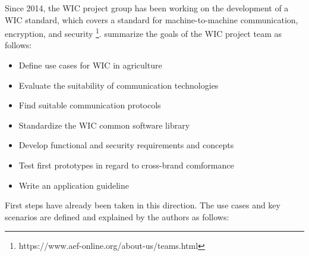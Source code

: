 Since 2014, the \ac{WIC} project group has been working on the development of a \ac{WIC} standard, which covers a standard for machine-to-machine communication, encryption, and security \footnote{https://www.aef-online.org/about-us/teams.html}.
\textcite{schlingmann_aef_2019} summarize the goals of the \ac{WIC} project team as follows:
\begin{itemize}
	\item Define use cases for \ac{WIC} in agriculture
	\item Evaluate the suitability of communication technologies
	\item Find suitable communication protocols
	\item Standardize the \ac{WIC} common software library
	\item Develop functional and security requirements and concepts
	\item Test first prototypes in regard to cross-brand comformance
	\item Write an application guideline
\end{itemize}
First steps have already been taken in this direction. The use cases and key scenarios are defined and explained by the authors as follows:
